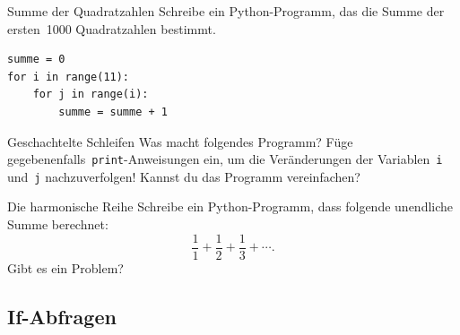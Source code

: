 \documentclass{blatt}
\begin{document}
\begin{aufgabe}{Summe der Quadratzahlen}
Schreibe ein Python-Programm, das die Summe der ersten~1000 Quadratzahlen
bestimmt.
\end{aufgabe}

\begin{lrbox}{\foobox}\begin{minipage}{\textwidth}\begin{verbatim}
summe = 0
for i in range(11):
    for j in range(i):
        summe = summe + 1
\end{verbatim}
\end{minipage}\end{lrbox}
\begin{aufgabe}{Geschachtelte Schleifen}
Was macht folgendes Programm? Füge
gegebenenfalls~\texttt{print}-Anweisungen ein, um die Veränderungen
der Variablen~\texttt{i} und~\texttt{j}
nachzuverfolgen! Kannst du das Programm vereinfachen?

\usebox{\foobox}
\end{aufgabe}

\begin{aufgabe}{Die harmonische Reihe}
Schreibe ein Python-Programm, dass folgende unendliche Summe berechnet:
\[ \frac{1}{1} + \frac{1}{2} + \frac{1}{3} + \cdots. \]
Gibt es ein Problem?
\end{aufgabe}


\subsection{If-Abfragen}
\end{document}
